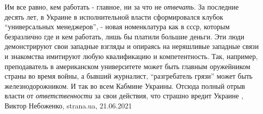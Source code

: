  
 
 
 
 

Им все равно, кем работать - главное, ни за что не \emph{отвечать}.  За
последние десять лет, в Украине в исполнительной власти сформировался клубок
\enquote{универсальных менеджеров}, - новая номенклатура как в ссср, которым безразлично
где и кем работать, лишь бы платили большие деньги. Эти люди демонстрируют свои
западные взгляды и опираясь на неряшливые западные связи и знакомства имитируют
любую квалификацию и компетентность. Так, например, преподаватель в
американском университете может быть главным оружейником страны во время войны,
а бывший журналист, \enquote{разгребатель грязи} может быть железнодорожником. И так во
всем Кабмине Украины.  Отсюда полный отрыв власти от \emph{ответственности} за
свои действия, что страшно вредит Украине
, 
Виктор Небоженко, strana.ua, 21.06.2021
